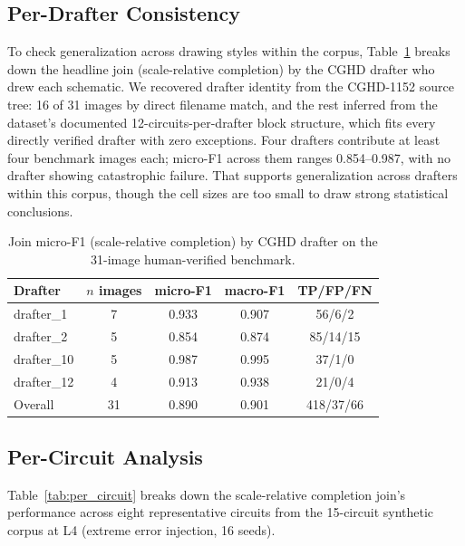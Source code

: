 \documentclass[journal]{IEEEtran}
\begin{document}
\subsection{Per-Drafter Consistency}
To check generalization across drawing styles within the corpus, Table~\ref{tab:per_drafter} breaks down the headline join (scale-relative completion) by the CGHD drafter who drew each schematic. We recovered drafter identity from the CGHD-1152 source tree: 16 of 31 images by direct filename match, and the rest inferred from the dataset's documented 12-circuits-per-drafter block structure, which fits every directly verified drafter with zero exceptions. Four drafters contribute at least four benchmark images each; micro-F1 across them ranges 0.854--0.987, with no drafter showing catastrophic failure. That supports generalization across drafters within this corpus, though the cell sizes are too small to draw strong statistical conclusions.

\begin{table}[htbp]
\caption{Join micro-F1 (scale-relative completion) by CGHD drafter on the 31-image human-verified benchmark.}
\label{tab:per_drafter}
\centering
\begin{tabular}{lcccc}
\hline
Drafter & $n$ images & micro-F1 & macro-F1 & TP/FP/FN \\
\hline
drafter\_1  & 7 & 0.933 & 0.907 & 56/6/2 \\
drafter\_2  & 5 & 0.854 & 0.874 & 85/14/15 \\
drafter\_10 & 5 & 0.987 & 0.995 & 37/1/0 \\
drafter\_12 & 4 & 0.913 & 0.938 & 21/0/4 \\
\hline
Overall    & 31 & 0.890 & 0.901 & 418/37/66 \\
\hline
\end{tabular}
\end{table}

\subsection{Per-Circuit Analysis}

Table~\ref{tab:per_circuit} breaks down the scale-relative completion join's performance across eight representative circuits from the 15-circuit synthetic corpus at L4 (extreme error injection, 16 seeds).
\end{document}
